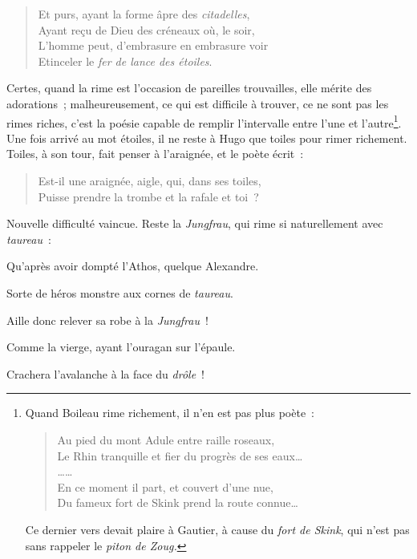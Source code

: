 \documentclass[french,twoside]{book} %
\newenvironment{quoteblock}%
  {\begin{quoting}}
  {\end{quoting}}
\newenvironment{quotebar}{%
    \def\FrameCommand{{\color{rubric!10!}\vrule width 0.5em} \hspace{0.9em}}%
    \def\OuterFrameSep{\itemsep} %
    \MakeFramed {\advance\hsize-\width \FrameRestore}
  }%
  {%
    \endMakeFramed
  }
\renewenvironment{quoteblock}%
  {%
    \savenotes
    \setstretch{0.9}
    \normalfont
    \begin{quotebar}
  }
  {%
    \end{quotebar}
    \spewnotes
  }
\begin{document}
\begin{verse}
Et purs, ayant la forme âpre des \emph{citadelles},\\
Ayant reçu de Dieu des créneaux où, le soir,\\
L’homme peut, d’embrasure en embrasure voir\\
Etinceler le \emph{fer de lance des étoiles}.\\
\end{verse}

\noindent Certes, quand la rime est l’occasion de pareilles trouvailles, elle mérite des adorations ; malheureusement, ce qui est difficile à trouver, ce ne sont pas les rimes riches, c’est la poésie capable de remplir l’intervalle entre l’une et l’autre\footnote{\noindent Quand Boileau rime richement, il n’en est pas plus poète :\par

\begin{verse}
Au pied du mont Adule entre raille roseaux,\\
Le Rhin tranquille et fier du progrès de ses eaux…\\
……\\
En ce moment il part, et couvert d’une nue,\\
Du fameux fort de Skink prend la route connue…\\
\end{verse}
\par
\noindent Ce dernier vers devait plaire à Gautier, à cause du \emph{fort de Skink}, qui n’est pas sans rappeler le \emph{piton de Zoug.}
}. Une fois arrivé au mot étoiles, il ne reste à Hugo que toiles pour rimer richement. Toiles, à son tour, fait penser à l’araignée, et le poète écrit :\par


\begin{verse}
Est-il une araignée, aigle, qui, dans ses toiles,\\
Puisse prendre la trombe et la rafale et toi ?\\
\end{verse}

\noindent Nouvelle difficulté vaincue. Reste la \emph{Jungfrau}, qui rime si naturellement avec \emph{taureau} :\par

\begin{quoteblock}
 \noindent Qu’après avoir dompté l’Athos, quelque Alexandre.\par
 Sorte de héros monstre aux cornes de \emph{taureau}.\par
 Aille donc relever sa robe à la \emph{Jungfrau} !\par
 Comme la vierge, ayant l’ouragan sur l’épaule.\par
 Crachera l’avalanche à la face du \emph{drôle} !
 \end{quoteblock}
\end{document}

